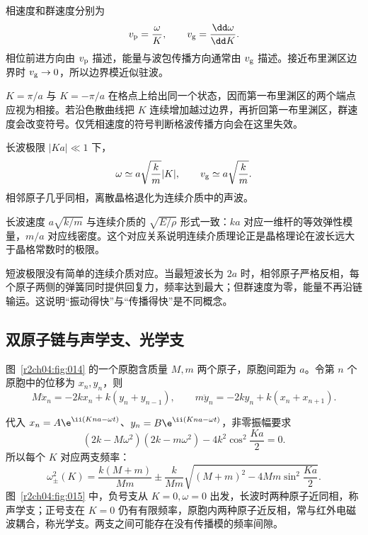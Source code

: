 相速度和群速度分别为
\begin{equation}
 v_{\rm p}=\frac\omega K,\qquad
 v_{\rm g}=\frac{\dd\omega}{\dd K}.
 \label{r2ch04:eq:034}
\end{equation}
相位前进方向由 $v_{\rm p}$ 描述，能量与波包传播方向通常由 $v_{\rm g}$ 描述。接近布里渊区边界时 $v_{\rm g}\to0$，所以边界模近似驻波。

$K=\pi/a$ 与 $K=-\pi/a$ 在格点上给出同一个状态，因而第一布里渊区的两个端点应视为相接。若沿色散曲线把 $K$ 连续增加越过边界，再折回第一布里渊区，群速度会改变符号。仅凭相速度的符号判断格波传播方向会在这里失效。

长波极限 $|Ka|\ll1$ 下，
\begin{equation}
 \omega\simeq a\sqrt{\frac km}|K|,\qquad
 v_{\rm g}\simeq a\sqrt{\frac km}.
 \label{r2ch04:eq:035}
\end{equation}
相邻原子几乎同相，离散晶格退化为连续介质中的声波。

长波速度 $a\sqrt{k/m}$ 与连续介质的 $\sqrt{E/\rho}$ 形式一致：$ka$ 对应一维杆的等效弹性模量，$m/a$ 对应线密度。这个对应关系说明连续介质理论正是晶格理论在波长远大于晶格常数时的极限。

短波极限没有简单的连续介质对应。当最短波长为 $2a$ 时，相邻原子严格反相，每个原子两侧的弹簧同时提供回复力，频率达到最大；但群速度为零，能量不再沿链输运。这说明“振动得快”与“传播得快”是不同概念。

\subsection{双原子链与声学支、光学支}

图~\ref{r2ch04:fig:014} 的一个原胞含质量 $M,m$ 两个原子，原胞间距为 $a$。令第 $n$ 个原胞中的位移为 $x_n,y_n$，则
\begin{equation}
 M\ddot x_n=-2kx_n+k(y_n+y_{n-1}),\qquad
 m\ddot y_n=-2ky_n+k(x_n+x_{n+1}).
 \label{r2ch04:eq:036}
\end{equation}
\figDiatomicChain

代入 $x_n=A\e^{\ii(Kna-\omega t)}$、$y_n=B\e^{\ii(Kna-\omega t)}$，非零振幅要求
\begin{equation}
 (2k-M\omega^2)(2k-m\omega^2)-4k^2\cos^2\frac{Ka}{2}=0.
 \label{r2ch04:eq:037}
\end{equation}
所以每个 $K$ 对应两支频率：
\begin{equation}
 \omega_\pm^2(K)=\frac{k(M+m)}{Mm}
 \pm\frac{k}{Mm}\sqrt{(M+m)^2-4Mm\sin^2\frac{Ka}{2}}.
 \label{r2ch04:eq:038}
\end{equation}
图~\ref{r2ch04:fig:015} 中，负号支从 $K=0,\omega=0$ 出发，长波时两种原子近同相，称声学支；正号支在 $K=0$ 仍有有限频率，原胞内两种原子近反相，常与红外电磁波耦合，称光学支。两支之间可能存在没有传播模的频率间隙。
\figAcousticOptical

